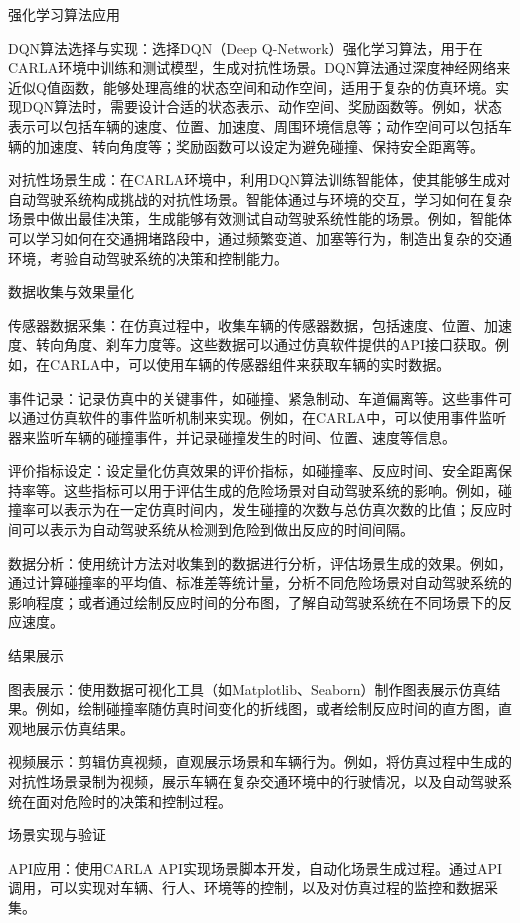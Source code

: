 强化学习算法应用

DQN算法选择与实现：选择DQN（Deep Q-Network）强化学习算法，用于在CARLA环境中训练和测试模型，生成对抗性场景。DQN算法通过深度神经网络来近似Q值函数，能够处理高维的状态空间和动作空间，适用于复杂的仿真环境。实现DQN算法时，需要设计合适的状态表示、动作空间、奖励函数等。例如，状态表示可以包括车辆的速度、位置、加速度、周围环境信息等；动作空间可以包括车辆的加速度、转向角度等；奖励函数可以设定为避免碰撞、保持安全距离等。

对抗性场景生成：在CARLA环境中，利用DQN算法训练智能体，使其能够生成对自动驾驶系统构成挑战的对抗性场景。智能体通过与环境的交互，学习如何在复杂场景中做出最佳决策，生成能够有效测试自动驾驶系统性能的场景。例如，智能体可以学习如何在交通拥堵路段中，通过频繁变道、加塞等行为，制造出复杂的交通环境，考验自动驾驶系统的决策和控制能力。

数据收集与效果量化

传感器数据采集：在仿真过程中，收集车辆的传感器数据，包括速度、位置、加速度、转向角度、刹车力度等。这些数据可以通过仿真软件提供的API接口获取。例如，在CARLA中，可以使用车辆的传感器组件来获取车辆的实时数据。

事件记录：记录仿真中的关键事件，如碰撞、紧急制动、车道偏离等。这些事件可以通过仿真软件的事件监听机制来实现。例如，在CARLA中，可以使用事件监听器来监听车辆的碰撞事件，并记录碰撞发生的时间、位置、速度等信息。

评价指标设定：设定量化仿真效果的评价指标，如碰撞率、反应时间、安全距离保持率等。这些指标可以用于评估生成的危险场景对自动驾驶系统的影响。例如，碰撞率可以表示为在一定仿真时间内，发生碰撞的次数与总仿真次数的比值；反应时间可以表示为自动驾驶系统从检测到危险到做出反应的时间间隔。

数据分析：使用统计方法对收集到的数据进行分析，评估场景生成的效果。例如，通过计算碰撞率的平均值、标准差等统计量，分析不同危险场景对自动驾驶系统的影响程度；或者通过绘制反应时间的分布图，了解自动驾驶系统在不同场景下的反应速度。

结果展示

图表展示：使用数据可视化工具（如Matplotlib、Seaborn）制作图表展示仿真结果。例如，绘制碰撞率随仿真时间变化的折线图，或者绘制反应时间的直方图，直观地展示仿真结果。

视频展示：剪辑仿真视频，直观展示场景和车辆行为。例如，将仿真过程中生成的对抗性场景录制为视频，展示车辆在复杂交通环境中的行驶情况，以及自动驾驶系统在面对危险时的决策和控制过程。

场景实现与验证

API应用：使用CARLA API实现场景脚本开发，自动化场景生成过程。通过API调用，可以实现对车辆、行人、环境等的控制，以及对仿真过程的监控和数据采集。

